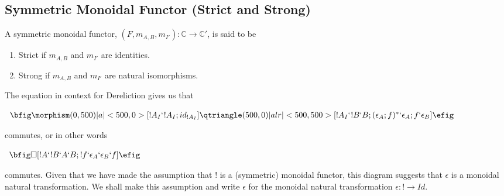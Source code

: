 \subsection{Symmetric Monoidal Functor (Strict and Strong)}
\label{subsec:symmetric_monoidal_functor_s_and_s}
\begin{definition}
    A symmetric monoidal functor, $(F,m_{A,B},m_{I'}): \mathbb{C} \rightarrow \mathbb{C}'$, is said to be
    \begin{enumerate}
        \item Strict if $m_{A,B}$ and $m_{I'}$ are identities.
        \item Strong if $m_{A,B}$ and $m_{I'}$ are natural isomorphisms.
    \end{enumerate}
    The equation in context for Dereliction gives us that
    \begin{center}
        \begin{math}
            \begin{array}{c}
                \bfig
                \morphism(0,500)|a|<500,0>[!A_I`!A_I;id_{!A_I}]
                \qtriangle(500,0)|alr|<500,500>[
                    !A_I`
                    !B`
                    B;
                    (\epsilon_A;f)^*`
                    \epsilon_A;f`
                    \epsilon_B
                ]
                \efig
            \end{array}
        \end{math}
    \end{center}
    commutes, or in other words
    \begin{center}
        \begin{math}
            \begin{array}{c}
                \bfig
                \square[!A`!B`A`B;!f`\epsilon_A`\epsilon_B`f]
                \efig
            \end{array}
        \end{math}
    \end{center}
    commutes.  Given that we have made the assumption that ! is a (symmetric) monoidal functor, this diagram suggests
    that $\epsilon$ is a monoidal natural transformation.  We shall make this assumption and write $\epsilon$ for the monoidal 
    natural transformation $\epsilon:! \rightarrow Id$.  
\end{definition}